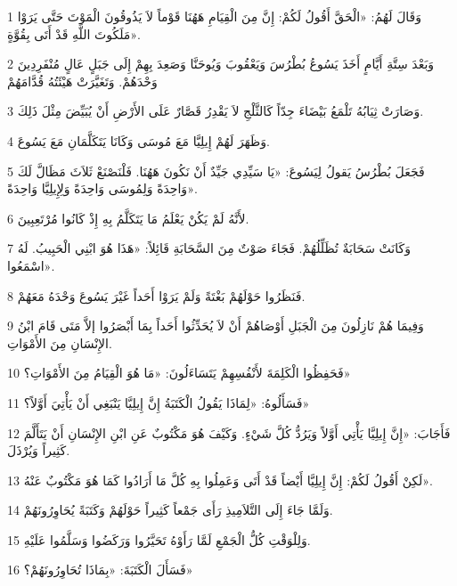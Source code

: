 \par 1 وَقَالَ لَهُمُ: «الْحَقَّ أَقُولُ لَكُمْ: إِنَّ مِنَ الْقِيَامِ هَهُنَا قَوْماً لاَ يَذُوقُونَ الْمَوْتَ حَتَّى يَرَوْا مَلَكُوتَ اللَّهِ قَدْ أَتَى بِقُوَّةٍ».
\par 2 وَبَعْدَ سِتَّةِ أَيَّامٍ أَخَذَ يَسُوعُ بُطْرُسَ وَيَعْقُوبَ وَيُوحَنَّا وَصَعِدَ بِهِمْ إِلَى جَبَلٍ عَالٍ مُنْفَرِدِينَ وَحْدَهُمْ. وَتَغَيَّرَتْ هَيْئَتُهُ قُدَّامَهُمْ
\par 3 وَصَارَتْ ثِيَابُهُ تَلْمَعُ بَيْضَاءَ جِدّاً كَالثَّلْجِ لاَ يَقْدِرُ قَصَّارٌ عَلَى الأَرْضِ أَنْ يُبَيِّضَ مِثْلَ ذَلِكَ.
\par 4 وَظَهَرَ لَهُمْ إِيلِيَّا مَعَ مُوسَى وَكَانَا يَتَكَلَّمَانِ مَعَ يَسُوعَ.
\par 5 فَجَعَلَ بُطْرُسُ يَقولُ لِيَسُوعَ: «يَا سَيِّدِي جَيِّدٌ أَنْ نَكُونَ هَهُنَا. فَلْنَصْنَعْ ثَلاَثَ مَظَالَّ لَكَ وَاحِدَةً وَلِمُوسَى وَاحِدَةً وَلِإِيلِيَّا وَاحِدَةً».
\par 6 لأَنَّهُ لَمْ يَكُنْ يَعْلَمُ مَا يَتَكَلَّمُ بِهِ إِذْ كَانُوا مُرْتَعِبِينَ.
\par 7 وَكَانَتْ سَحَابَةٌ تُظَلِّلُهُمْ. فَجَاءَ صَوْتٌ مِنَ السَّحَابَةِ قَائِلاً: «هَذَا هُوَ ابْنِي الْحَبِيبُ. لَهُ اسْمَعُوا».
\par 8 فَنَظَرُوا حَوْلَهُمْ بَغْتَةً وَلَمْ يَرَوْا أَحَداً غَيْرَ يَسُوعَ وَحْدَهُ مَعَهُمْ.
\par 9 وَفِيمَا هُمْ نَازِلُونَ مِنَ الْجَبَلِ أَوْصَاهُمْ أَنْ لاَ يُحَدِّثُوا أَحَداً بِمَا أَبْصَرُوا إلاَّ مَتَى قَامَ ابْنُ الإِنْسَانِ مِنَ الأَمْوَاتِ.
\par 10 فَحَفِظُوا الْكَلِمَةَ لأَنْفُسِهِمْ يَتَسَاءَلُونَ: «مَا هُوَ الْقِيَامُ مِنَ الأَمْوَاتِ؟»
\par 11 فَسَأَلُوهُ: «لِمَاذَا يَقُولُ الْكَتَبَةُ إِنَّ إِيلِيَّا يَنْبَغِي أَنْ يَأْتِيَ أَوَّلاً؟»
\par 12 فَأَجَابَ: «إِنَّ إِيلِيَّا يَأْتِي أَوَّلاً وَيَرُدُّ كُلَّ شَيْءٍ. وَكَيْفَ هُوَ مَكْتُوبٌ عَنِ ابْنِ الإِنْسَانِ أَنْ يَتَأَلَّمَ كَثِيراً وَيُرْذَلَ.
\par 13 لَكِنْ أَقُولُ لَكُمْ: إِنَّ إِيلِيَّا أَيْضاً قَدْ أَتَى وَعَمِلُوا بِهِ كُلَّ مَا أَرَادُوا كَمَا هُوَ مَكْتُوبٌ عَنْهُ».
\par 14 وَلَمَّا جَاءَ إِلَى التَّلاَمِيذِ رَأَى جَمْعاً كَثِيراً حَوْلَهُمْ وَكَتَبَةً يُحَاوِرُونَهُمْ.
\par 15 وَلِلْوَقْتِ كُلُّ الْجَمْعِ لَمَّا رَأَوْهُ تَحَيَّرُوا وَرَكَضُوا وَسَلَّمُوا عَلَيْهِ.
\par 16 فَسَأَلَ الْكَتَبَةَ: «بِمَاذَا تُحَاوِرُونَهُمْ؟»
